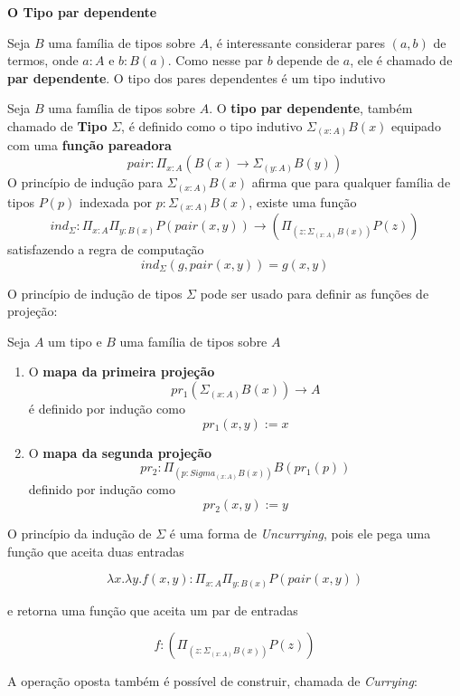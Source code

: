 \documentclass[../main.tex]{subfiles}
\begin{document}
\textbf{O Tipo par dependente}

Seja $B$ uma família de tipos sobre $A$, é interessante considerar pares $(a, b)$ de termos, onde $a : A$ e $b : B(a)$. Como nesse par $b$ depende de $a$, ele é chamado de \textbf{par dependente}. O tipo dos pares dependentes é um tipo indutivo

\begin{definition}
    Seja $B$ uma família de tipos sobre $A$. O \textbf{tipo par dependente}, também chamado de \textbf{Tipo} $\Sigma$, é definido como o tipo indutivo $\Sigma_{(x : A)}B(x)$ equipado com uma \textbf{função pareadora}
    $$pair : \Pi_{x : A}(B(x) \to \Sigma_{(y : A)} B(y))$$
    O princípio de indução para $\Sigma_{(x : A)}B(x)$ afirma que para qualquer família de tipos $P(p)$ indexada por $p : \Sigma_{(x : A)}B(x)$, existe uma função
    $$ind_{\Sigma} : \Pi_{x : A}\Pi_{y : B(x)}P(pair(x, y)) \to (\Pi_{(z : \Sigma_{(x : A)}B(x))} P(z))$$
    satisfazendo a regra de computação
    $$ind_{\Sigma}(g, pair(x, y)) = g(x, y)$$

\end{definition}

O princípio de indução de tipos $\Sigma$ pode ser usado para definir as funções de projeção:

\begin{definition}
    Seja $A$ um tipo e $B$ uma família de tipos sobre $A$
    \begin{enumerate}
        \item O \textbf{mapa da primeira projeção} $$pr_1 (\Sigma_{(x : A)}B(x)) \to A$$ é definido por indução como $$pr_1(x, y) := x$$
        \item O \textbf{mapa da segunda projeção} $$pr_2 : \Pi_{(p : Sigma_{(x : A)} B(x))} B(pr_1 (p))$$ definido por indução como $$pr_2(x, y) := y$$
    \end{enumerate}
\end{definition}

O princípio da indução de $\Sigma$ é uma forma de \emph{Uncurrying}, pois ele pega uma função que aceita duas entradas

$$\lambda x . \lambda y . f(x, y) : \Pi_{x : A}\Pi_{y : B(x)}P(pair(x, y))$$

e retorna uma função que aceita um par de entradas

$$f : (\Pi_{(z : \Sigma_{(x : A)}B(x))} P(z))$$

A operação oposta também é possível de construir, chamada de \emph{Currying}:
\end{document}
